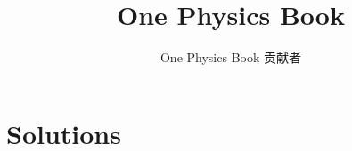 \documentclass[11pt,a4paper,twoside,openany]{book}
\title{One Physics Book}
\author{One Physics Book 贡献者}
\date{\bookdate}
\begin{document}
\mainmatter
\setcounter{chapter}{6}

\appendix
\chapter{Solutions}

\end{document}
